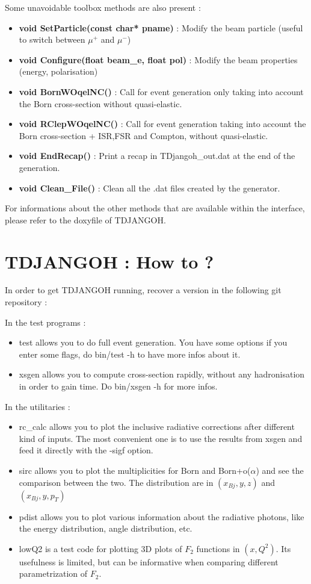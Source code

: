 \documentclass[letterpaper,12pt]{article}
\begin{document}
Some unavoidable toolbox methods are also present :
\begin{itemize}
\item \textbf{{\color{orange}void} SetParticle(const char* pname)} : Modify the beam particle (useful to switch between $\mu^{+}$ and $\mu^{-}$)
\item \textbf{{\color{orange}void} Configure(float beam\_e, float pol)} : Modify the beam properties (energy, polarisation)
\item \textbf{{\color{orange}void} BornWOqelNC()} : Call for event generation only taking into account the Born cross-section without quasi-elastic.
\item \textbf{{\color{orange}void} RClepWOqelNC()} : Call for event generation taking into account the Born cross-section + ISR,FSR and Compton, without quasi-elastic.
\item \textbf{{\color{orange}void} EndRecap()} : Print a recap in TDjangoh\_out.dat at the end of the generation.
\item \textbf{{\color{orange}void} Clean\_File()} : Clean all the .dat files created by the generator.
\end{itemize}

For informations about the other methods that are available within the interface, please refer to the
doxyfile of TDJANGOH.

\newpage
\section{TDJANGOH : How to ?}

In order to get TDJANGOH running, recover a version in the following git repository :

In the test programs :
\begin{itemize}
\item test allows you to do full event generation. You have some options if you enter
some flags, do bin/test -h to have more infos about it.
\item xsgen allows you to compute cross-section rapidly, without any hadronisation in
order to gain time. Do bin/xsgen -h for more infos.
\end{itemize}

In the utilitaries :
\begin{itemize}
\item rc\_calc allows you to plot the inclusive radiative corrections after different kind of inputs. The most
convenient one is to use the results from xsgen and feed it directly with the -sigf option.
\item sirc allows you to plot the multiplicities for Born and Born+o($\alpha$) and see the comparison between
the two. The distribution are in $(x_{Bj},y,z)$ and $(x_{Bj},y,p_T)$
\item pdist allows you to plot various information about the radiative photons, like the energy distribution,
angle distribution, etc.
\item lowQ2 is a test code for plotting 3D plots of $F_2$ functions in $(x,Q^2)$. Its usefulness is limited,
but can be informative when comparing different parametrization of $F_2$.
\end{itemize}
\end{document}

